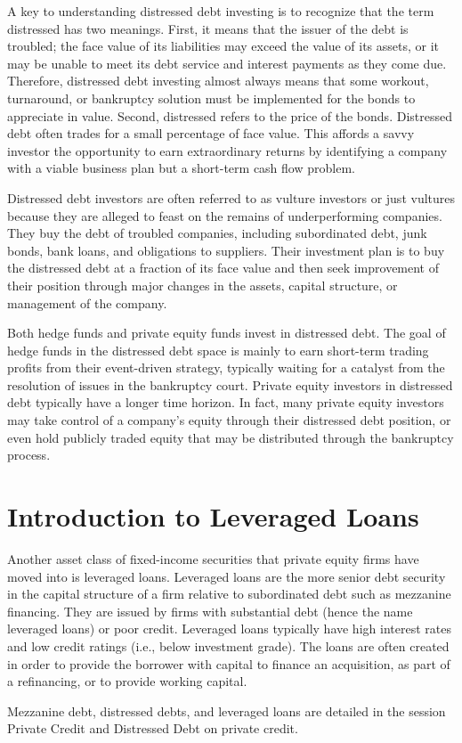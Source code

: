 \documentclass[11pt]{article}
\begin{document}
A key to understanding distressed debt investing is to recognize that the term distressed has two meanings. First, it means that the issuer of the debt is troubled; the face value of its liabilities may exceed the value of its assets, or it may be unable to meet its debt service and interest payments as they come due. Therefore, distressed debt investing almost always means that some workout, turnaround, or bankruptcy solution must be implemented for the bonds to appreciate in value. Second, distressed refers to the price of the bonds. Distressed debt often trades for a small percentage of face value. This affords a savvy investor the opportunity to earn extraordinary returns by identifying a company with a viable business plan but a short-term cash flow problem.

Distressed debt investors are often referred to as vulture investors or just vultures because they are alleged to feast on the remains of underperforming companies. They buy the debt of troubled companies, including subordinated debt, junk bonds, bank loans, and obligations to suppliers. Their investment plan is to buy the distressed debt at a fraction of its face value and then seek improvement of their position through major changes in the assets, capital structure, or management of the company.

Both hedge funds and private equity funds invest in distressed debt. The goal of hedge funds in the distressed debt space is mainly to earn short-term trading profits from their event-driven strategy, typically waiting for a catalyst from the resolution of issues in the bankruptcy court. Private equity investors in distressed debt typically have a longer time horizon. In fact, many private equity investors may take control of a company's equity through their distressed debt position, or even hold publicly traded equity that may be distributed through the bankruptcy process.

\section*{Introduction to Leveraged Loans}
Another asset class of fixed-income securities that private equity firms have moved into is leveraged loans. Leveraged loans are the more senior debt security in the capital structure of a firm relative to subordinated debt such as mezzanine financing. They are issued by firms with substantial debt (hence the name leveraged loans) or poor credit. Leveraged loans typically have high interest rates and low credit ratings (i.e., below investment grade). The loans are often created in order to provide the borrower with capital to finance an acquisition, as part of a refinancing, or to provide working capital.

Mezzanine debt, distressed debts, and leveraged loans are detailed in the session Private Credit and Distressed Debt on private credit.
\end{document}
